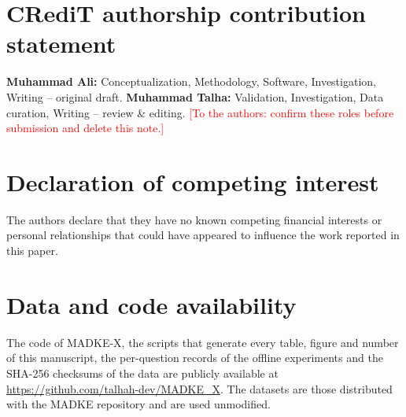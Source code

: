 \section*{CRediT authorship contribution statement}
\textbf{Muhammad Ali:} Conceptualization, Methodology, Software, Investigation, Writing -- original draft. \textbf{Muhammad Talha:} Validation, Investigation, Data curation, Writing -- review \& editing. \textcolor{red}{[To the authors: confirm these roles before submission and delete this note.]}

\section*{Declaration of competing interest}
The authors declare that they have no known competing financial interests or personal relationships that could have appeared to influence the work reported in this paper.

\section*{Data and code availability}
The code of MADKE-X, the scripts that generate every table, figure and number of this manuscript, the per-question records of the offline experiments and the SHA-256 checksums of the data are publicly available at \url{https://github.com/talhah-dev/MADKE_X}. The datasets are those distributed with the MADKE repository \cite{madke2025code} and are used unmodified.
